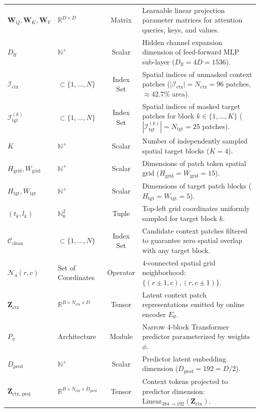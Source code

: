 \documentclass{article}
\begin{document}
\begin{table}[ht]
{\begin{tabular}{llcp{8.2cm}}
$\mathbf{W}_Q, \mathbf{W}_K, \mathbf{W}_V$ & $\mathbb{R}^{D \times D}$ & Matrix & Learnable linear projection parameter matrices for attention queries, keys, and values. \\
$D_{\text{ff}}$ & $\mathbb{N}^+$ & Scalar & Hidden channel expansion dimension of feed-forward MLP sub-layer ($D_{\text{ff}} = 4D = 1536$). \\
$\mathcal{I}_{\text{ctx}}$ & $\subset \{1, \dots, N\}$ & Index Set & Spatial indices of unmasked context patches ($|\mathcal{I}_{\text{ctx}}| = N_{\text{ctx}} = 96$ patches, $\approx 42.7\%$ area). \\
$\mathcal{I}_{\text{tgt}}^{(k)}$ & $\subset \{1, \dots, N\}$ & Index Set & Spatial indices of masked target patches for block $k \in \{1, \dots, K\}$ ($|\mathcal{I}_{\text{tgt}}^{(k)}| = N_{\text{tgt}} = 25$ patches). \\
$K$ & $\mathbb{N}^+$ & Scalar & Number of independently sampled spatial target blocks ($K = 4$). \\
$H_{\text{grid}}, W_{\text{grid}}$ & $\mathbb{N}^+$ & Scalar & Dimensions of patch token spatial grid ($H_{\text{grid}} = W_{\text{grid}} = 15$). \\
$H_{\text{tgt}}, W_{\text{tgt}}$ & $\mathbb{N}^+$ & Scalar & Dimensions of target patch blocks ($H_{\text{tgt}} = W_{\text{tgt}} = 5$). \\
$(t_k, l_k)$ & $\mathbb{N}_0^2$ & Tuple & Top-left grid coordinates uniformly sampled for target block $k$. \\
$\mathcal{C}_{\text{clean}}$ & $\subset \{1, \dots, N\}$ & Index Set & Candidate context patches filtered to guarantee zero spatial overlap with any target block. \\
$\mathcal{N}_4(r, c)$ & Set of Coordinates & Operator & 4-connected spatial grid neighborhood: $\{(r\pm 1, c), (r, c\pm 1)\}$. \\
$\mathbf{Z}_{\text{ctx}}$ & $\mathbb{R}^{B \times N_{\text{ctx}} \times D}$ & Tensor & Latent context patch representations emitted by online encoder $E_\theta$. \\
$P_\phi$ & Architecture & Module & Narrow 4-block Transformer predictor parameterized by weights $\phi$. \\
$D_{\text{pred}}$ & $\mathbb{N}^+$ & Scalar & Predictor latent embedding dimension ($D_{\text{pred}} = 192 = D/2$). \\
$\mathbf{Z}_{\text{ctx, proj}}$ & $\mathbb{R}^{B \times N_{\text{ctx}} \times D_{\text{pred}}}$ & Tensor & Context tokens projected to predictor dimension: $\text{Linear}_{384 \to 192}(\mathbf{Z}_{\text{ctx}})$. \\

\end{tabular}}
\end{table}
\end{document}
